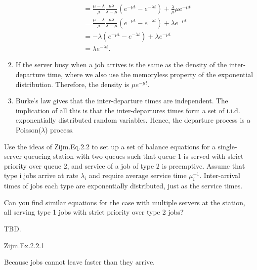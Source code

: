 \begin{question}
\begin{solution}
\begin{enumerate}
\begin{equation*}
\begin{split}
&= \frac{\mu-\lambda}\mu \frac{\mu\lambda}{\lambda-\mu}\left(e^{-\mu t}-e^{-\lambda t}\right)  +    \frac\lambda \mu \mu e^{-\mu t} \\
&= \frac{\mu-\lambda}\mu \frac{\mu\lambda}{\lambda-\mu}\left(e^{-\mu t}-e^{-\lambda t}\right)  +    \lambda e^{-\mu t} \\
&= - \lambda\left(e^{-\mu t}-e^{-\lambda t}\right)  +    \lambda e^{-\mu t} \\
&=  \lambda e^{-\lambda t}.
        \end{split}
      \end{equation*}
    \item       If the server busy when a job arrives is the same as the density
      of the inter-departure time, where we also use the memoryless
      property of the exponential distribution. Therefore, the density
      is $\mu e^{-\mu t}$.
    \item       Burke's law gives that the inter-departure times are independent.
      The implication of all this is that the inter-departures times
      form a set of i.i.d. exponentially distributed random variables.
      Hence, the departure process is a Poisson($\lambda$) process.
  \end{enumerate}
    \end{solution}
\end{question}


\begin{question}[use=false]
  Use the ideas of Zijm.Eq.2.2 to set up a set of balance equations
  for a single-server queueing station with two queues such that queue
  1 is served with strict priority over queue 2, and service of a job
  of type 2 is preemptive. Assume that type i jobs arrive at rate
  $\lambda_i$ and require average service time
  $\mu_i^{-1}$. Inter-arrival times of jobs each type are exponentially distributed,
  just as the service times.

  Can you find similar equations for the case with multiple servers at
  the station, all serving type 1 jobs with strict priority over type
  2 jobs?
  \begin{solution}
    TBD.
  \end{solution}
\end{question}


\begin{question}
Zijm.Ex.2.2.1
\begin{solution}
Because jobs cannot leave faster than they arrive.
\end{solution}
\end{question}

